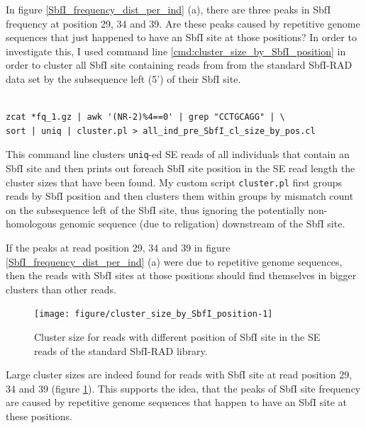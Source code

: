 \documentclass[a4paper,12pt,times,print,index,custombib,custommargin]{PhDThesisPSnPDF}\usepackage[]{graphicx}\usepackage[]{color}
\newenvironment{knitrout}{}{} %
\begin{document}
In figure \ref{SbfI_frequency_dist_per_ind} (a), there are three peaks in SbfI frequency at position 29, 34 and 39. Are these peaks caused by repetitive genome sequences that just happened to have an SbfI site at those positions? In order to investigate this, I used command line \ref{cmd:cluster_size_by_SbfI_position} in order to cluster all SbfI site containing reads from from the standard SbfI-RAD data set by the subsequence left (5') of their SbfI site.
%
\begin{cmd}
\captionsetup{type=cmd}
\begin{Verbatim}[fontsize=\scriptsize, formatcom=\color{darkgray}]

zcat *fq_1.gz | awk '(NR-2)%4==0' | grep "CCTGCAGG" | \
sort | uniq | cluster.pl > all_ind_pre_SbfI_cl_size_by_pos.cl
\end{Verbatim}
\caption{\small This command line clusters \texttt{uniq}-ed SE reads of all individuals that contain an SbfI site and then prints out foreach SbfI site position in the SE read length the cluster sizes that have been found. My custom script \texttt{cluster.pl} first groups reads by SbfI position and then clusters them within groups by mismatch count on the subsequence left of the SbfI site, thus ignoring the potentially non-homologous genomic sequence (due to religation) downstream of the SbfI site.}
\label{cmd:cluster_size_by_SbfI_position}
\end{cmd}
%
If the peaks at read position 29, 34 and 39 in figure \ref{SbfI_frequency_dist_per_ind} (a) were due to repetitive genome sequences, then the reads with SbfI sites at those positions should find themselves in bigger clusters than other reads.
%
\begin{figure}
\begin{knitrout}
\color{fgcolor}

{\centering \texttt{[image: figure/cluster\_size\_by\_SbfI\_position-1]} 

}



\end{knitrout}
\caption{Cluster size for reads with different position of SbfI site in the SE reads of the standard SbfI-RAD library.}
\label{cluster_size_by_SbfI_position}
\end{figure}
%
Large cluster sizes are indeed found for reads with SbfI site at read position 29, 34 and 39 (figure \ref{cluster_size_by_SbfI_position}). This supports the idea, that the peaks of SbfI site frequency are caused by repetitive genome sequences that happen to have an SbfI site at these positions.
\end{document}
